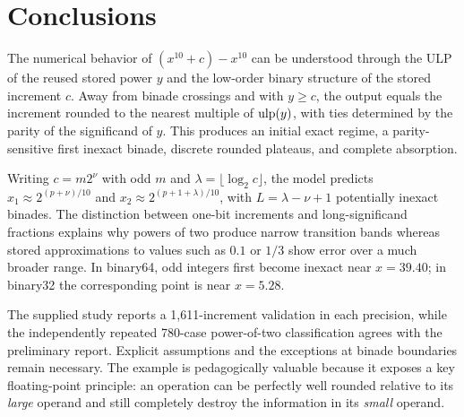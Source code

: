 \chapter{Conclusions}\label{ch:conclusion}
The numerical behavior of $(x^{10}+c)-x^{10}$ can be understood through the ULP of the reused stored power $y$ and the low-order binary structure of the stored increment $c$. Away from binade crossings and with $y\ge c$, the output equals the increment rounded to the nearest multiple of $\operatorname{ulp}(y)$, with ties determined by the parity of the significand of $y$. This produces an initial exact regime, a parity-sensitive first inexact binade, discrete rounded plateaus, and complete absorption.

Writing $c=m2^{\nu}$ with odd $m$ and $\lambda=\lfloor\log_2c\rfloor$, the model predicts $x_1\approx2^{(p+\nu)/10}$ and $x_2\approx2^{(p+1+\lambda)/10}$, with $L=\lambda-\nu+1$ potentially inexact binades. The distinction between one-bit increments and long-significand fractions explains why powers of two produce narrow transition bands whereas stored approximations to values such as $0.1$ or $1/3$ show error over a much broader range. In binary64, odd integers first become inexact near $x=39.40$; in binary32 the corresponding point is near $x=5.28$.

The supplied study reports a 1,611-increment validation in each precision, while the independently repeated 780-case power-of-two classification agrees with the preliminary report. Explicit assumptions and the exceptions at binade boundaries remain necessary. The example is pedagogically valuable because it exposes a key floating-point principle: an operation can be perfectly well rounded relative to its \emph{large} operand and still completely destroy the information in its \emph{small} operand.
